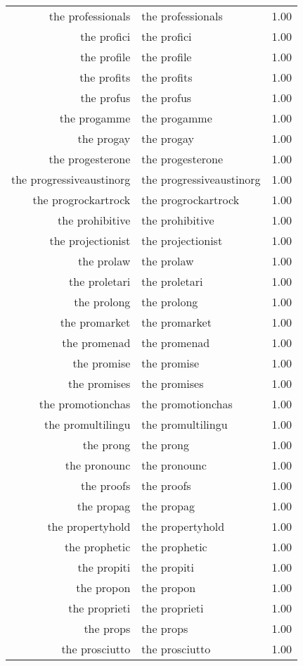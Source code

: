 \begin{table}[ht]
\begin{tabular}{rlr}
  the professionals & the professionals & 1.00 \\ 
  the profici & the profici & 1.00 \\ 
  the profile & the profile & 1.00 \\ 
  the profits & the profits & 1.00 \\ 
  the profus & the profus & 1.00 \\ 
  the progamme & the progamme & 1.00 \\ 
  the progay & the progay & 1.00 \\ 
  the progesterone & the progesterone & 1.00 \\ 
  the progressiveaustinorg & the progressiveaustinorg & 1.00 \\ 
  the progrockartrock & the progrockartrock & 1.00 \\ 
  the prohibitive & the prohibitive & 1.00 \\ 
  the projectionist & the projectionist & 1.00 \\ 
  the prolaw & the prolaw & 1.00 \\ 
  the proletari & the proletari & 1.00 \\ 
  the prolong & the prolong & 1.00 \\ 
  the promarket & the promarket & 1.00 \\ 
  the promenad & the promenad & 1.00 \\ 
  the promise & the promise & 1.00 \\ 
  the promises & the promises & 1.00 \\ 
  the promotionchas & the promotionchas & 1.00 \\ 
  the promultilingu & the promultilingu & 1.00 \\ 
  the prong & the prong & 1.00 \\ 
  the pronounc & the pronounc & 1.00 \\ 
  the proofs & the proofs & 1.00 \\ 
  the propag & the propag & 1.00 \\ 
  the propertyhold & the propertyhold & 1.00 \\ 
  the prophetic & the prophetic & 1.00 \\ 
  the propiti & the propiti & 1.00 \\ 
  the propon & the propon & 1.00 \\ 
  the proprieti & the proprieti & 1.00 \\ 
  the props & the props & 1.00 \\ 
  the prosciutto & the prosciutto & 1.00 \\ 

\end{tabular}
\end{table}
